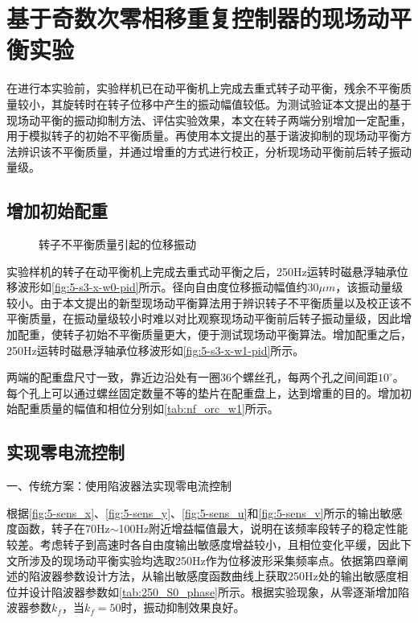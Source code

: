 \documentclass[
  lang=cn,
  degree=master,
  openany,oneside
]{nuaathesis}
\begin{document}
\section{基于奇数次零相移重复控制器的现场动平衡实验}
在进行本实验前，实验样机已在动平衡机上完成去重式转子动平衡，残余不平衡质量较小，其旋转时在转子位移中产生的振动幅值较低。为测试验证本文提出的基于现场动平衡的振动抑制方法、评估实验效果，本文在转子两端分别增加一定配重，用于模拟转子的初始不平衡质量。再使用本文提出的基于谐波抑制的现场动平衡方法辨识该不平衡质量，并通过增重的方式进行校正，分析现场动平衡前后转子振动量级。

\subsection{增加初始配重}

\begin{figure}[h!]  
	\quad  
	  		\caption{转子不平衡质量引起的位移振动}  \label{fig:5-s3-x-w0/w1}\end{figure}
	
实验样机的转子在动平衡机上完成去重式动平衡之后，250Hz运转时磁悬浮轴承位移波形如\autoref{fig:5-s3-x-w0-pid}所示。径向自由度位移振动幅值约$30\mu m$，该振动量级较小。由于本文提出的新型现场动平衡算法用于辨识转子不平衡质量以及校正该不平衡质量，在振动量级较小时难以对比观察现场动平衡前后转子振动量级，因此增加配重，使转子初始不平衡质量更大，便于测试现场动平衡算法。增加配重之后，250Hz运转时磁悬浮轴承位移波形如\autoref{fig:5-s3-x-w1-pid}所示。



两端的配重盘尺寸一致，靠近边沿处有一圈36个螺丝孔，每两个孔之间间距$10^{\circ}$。每个孔上可以通过螺丝固定数量不等的垫片在配重盘上，达到增重的目的。增加初始配重质量的幅值和相位分别如\autoref{tab:nf_orc_w1}所示。

\subsection{实现零电流控制}

一、传统方案：使用陷波器法实现零电流控制

根据\autoref{fig:5-sens_x}、\autoref{fig:5-sens_y}、\autoref{fig:5-sens_u}和\autoref{fig:5-sens_v}所示的输出敏感度函数，转子在70Hz$\sim$100Hz附近增益幅值最大，说明在该频率段转子的稳定性能较差。考虑转子到高速时各自由度输出敏感度增益较小，且相位变化平缓，因此下文所涉及的现场动平衡实验均选取250Hz作为位移波形采集频率点。依据第四章阐述的陷波器参数设计方法，从输出敏感度函数曲线上获取250Hz处的输出敏感度相位并设计陷波器参数如\autoref{tab:250_S0_phase}所示。根据实验现象，从零逐渐增加陷波器参数$k_f$，当$k_f = 50$时，振动抑制效果良好。
\end{document}
